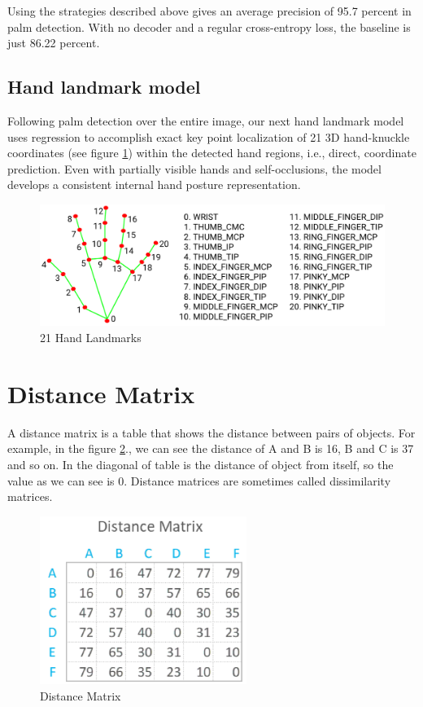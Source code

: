 Using the strategies described above gives an average precision of 95.7 percent in palm detection. With no decoder and a regular cross-entropy loss, the baseline is just 86.22 percent.

\subsection{Hand landmark model}
Following palm detection over the entire image, our next hand landmark model uses regression to accomplish exact key point localization of 21 3D hand-knuckle coordinates (see figure \ref{fig:Chap3-HandLandMark}) within the detected hand regions, i.e., direct, coordinate prediction. Even with partially visible hands and self-occlusions, the model develops a consistent internal hand posture representation.
\begin{figure}[H]
	\centering
	\includegraphics[width=\textwidth]{img/Chap3/HandLandMark}
	\caption{ 21 Hand Landmarks }
	\label{fig:Chap3-HandLandMark}
\end{figure}


\section{Distance Matrix}
A distance matrix \cite{DistanceMatrix} is a table that shows the distance between pairs of objects.
For example, in the figure \ref{fig:Chap3-DM}., we can see the distance of A and B is 16, B and C is 37
and so on. In the diagonal of table is the distance of object from itself, so the value
as we can see is 0. Distance matrices are sometimes called dissimilarity matrices.

\begin{figure}[H]
	\centering
	\includegraphics[width=0.6\textwidth]{img/Chap3/DM}
	\caption{ Distance Matrix }
	\label{fig:Chap3-DM}
\end{figure}

